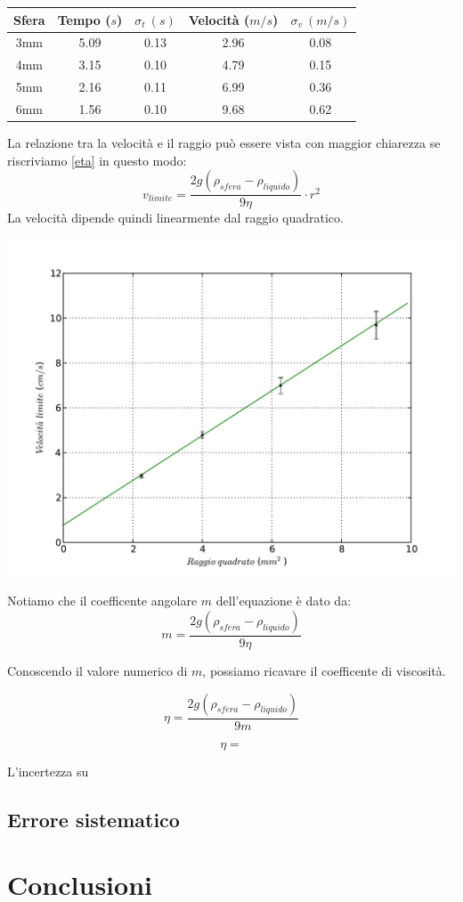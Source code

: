 \begin{center}
\begin{tabular}{c|c|c|c|c}
Sfera & Tempo ($s$) & $\sigma_t\ (s) $ & Velocità ($m/s$) & $\sigma_v \ (m/s) $\\
\midrule
3mm & 5.09 & 0.13 & 2.96 & 0.08\\
4mm & 3.15 & 0.10 & 4.79 & 0.15\\
5mm & 2.16 & 0.11 & 6.99 & 0.36\\
6mm & 1.56 & 0.10 & 9.68 & 0.62\\
\end{tabular}
\end{center}
La relazione tra la velocità e il raggio può essere vista con maggior chiarezza se riscriviamo \ref{eta}  in questo modo: 
\begin{equation}\label{vlim}
v_{limite}=  \frac{2g(\rho_{sfera} - \rho_{liquido})}{9 \eta} \cdot r^2
\end{equation}
La velocità dipende quindi linearmente dal raggio quadratico.

\begin{center}
\includegraphics[scale=0.75]{../grafici/velocita}
\end{center}

Notiamo che il coefficente angolare $m$ dell'equazione \label{vlim} è dato da:
\begin{equation}
m= \frac{2g(\rho_{sfera} - \rho_{liquido})}{9 \eta}
\end{equation}

Conoscendo il valore numerico di $m$, possiamo ricavare il coefficente di viscosità.

\begin{equation}
\eta = \frac{2g(\rho_{sfera} - \rho_{liquido})}{9 m}
\end{equation}

$$\eta = $$

L'incertezza su 


\subsection*{Errore sistematico}
\section{Conclusioni}

